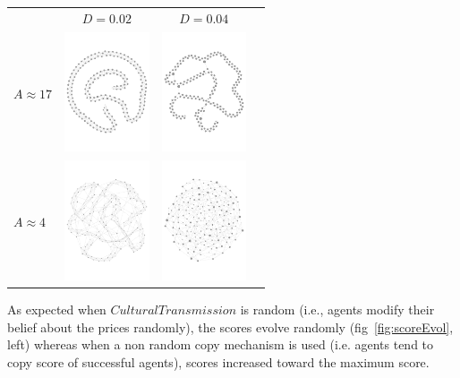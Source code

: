 \documentclass[paperwidth=42in, paperheight=33.1in,landscape,showframe,fontscale=.42]{baposter}
\begin{document}
\begin{poster}
{		    \begin{center}
			\begin{tabular}{lccc}
			    &$D=0.02$ & $D=0.04$\\
			    $A\approx17$&
			    \includegraphics[width=2.5cm]{img/g02.pdf}&
			    \includegraphics[width=2.5cm]{img/g00.pdf}\\
			    $A\approx4$&
			    \includegraphics[width=2.5cm]{img/g42.pdf}&
			    \includegraphics[width=2.5cm]{img/g40.pdf}\\
			\end{tabular}

		    \end{center}


		    As expected when $CulturalTransmission$ is random (i.e., agents modify their belief about the prices randomly), the scores evolve randomly (fig~\ref{fig:scoreEvol}, left) whereas when a non random copy mechanism is used (i.e. agents tend to copy score of successful agents), scores increased toward the maximum score.
}
\end{poster}
\end{document}
